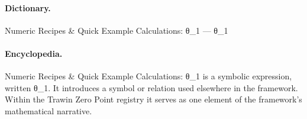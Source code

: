 \paragraph{Dictionary.}
Numeric Recipes \& Quick Example Calculations: θ\_1 — θ\_1

\paragraph{Encyclopedia.}
Numeric Recipes \& Quick Example Calculations: θ\_1 is a symbolic expression, written θ\_1. It introduces a symbol or relation used elsewhere in the framework. Within the Trawin Zero Point registry it serves as one element of the framework's mathematical narrative.
